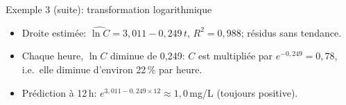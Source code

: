 \documentclass{BeamerTemplate}
\begin{document}
\begin{frame}[t]{Exemple 3 (suite): transformation logarithmique}

\centering
{}\hspace{2mm}
\begin{minipage}[b]{0.46\textwidth}
\small
\begin{itemize}\itemsep1.5mm
  \item<2-> Droite estimée: $\widehat{\ln C}=3{,}011-0{,}249\,t$, $R^2=0{,}988$;
  résidus sans tendance.
  \item<3-> Chaque heure, $\ln C$ diminue de 0,249: $C$ est
  \alert{multipliée} par $e^{-0{,}249}=0{,}78$, i.e.\ elle \alert{diminue
  d'environ 22\,\% par heure}.
  \item<4-> Prédiction à 12\,h: $e^{3{,}011-0{,}249\times12}\approx1{,}0$\,mg/L
  (toujours positive).
\end{itemize}
\vspace{4mm}
\end{minipage}

\raggedright
{}

\end{frame}
\end{document}
